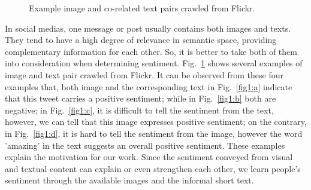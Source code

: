 \documentclass{article}
\begin{document}
\begin{figure}[t]\centering
	\vspace{-0.1cm}
	\caption{Example image and co-related text pairs crawled from Flickr.}
	\label{fig:prossess4}
	\vspace{-0.3cm}
\end{figure}


In social medias, one message or post usually contains both images and texts. They tend to have a high degree of relevance in semantic space, providing complementary information for each other. So, it is better to take both of them into consideration when determining sentiment. Fig.~\ref{fig:prossess4} shows several examples of image and text pair crawled from Flickr\footnotemark[1]. It can be observed from these four examples that, both image and the corresponding text in Fig.~\ref{fig1:a} indicate that this tweet carries a positive sentiment; while in Fig.~\ref{fig1:b} both are negative; in Fig.~\ref{fig1:c}, it is difficult to tell the sentiment from the text, however, we can tell that this image expresses positive sentiment; on the contrary, in Fig.~\ref{fig1:d}, it is hard to tell the sentiment from the image, however the word 'amazing' in the text suggests an overall positive sentiment. These examples explain the motivation for our work. Since the sentiment conveyed from visual and textual content can explain or even strengthen each other, we learn people's sentiment through the available images and the informal short text.
\end{document}

